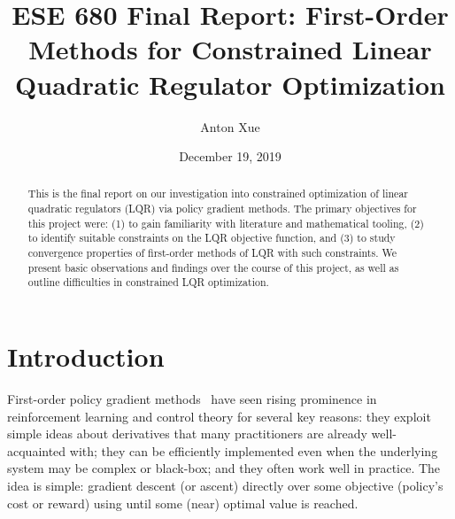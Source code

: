 \documentclass[11pt]{article}  %
\title{\LARGE \bf
ESE 680 Final Report:
First-Order Methods for
Constrained Linear Quadratic Regulator Optimization
}
\author{Anton Xue}%
\date{December 19, 2019}
\begin{document}

\maketitle
\thispagestyle{empty}
\pagestyle{empty}



\begin{abstract}
This is the final report on our investigation into
constrained optimization of linear quadratic regulators (LQR)
via policy gradient methods.
The primary objectives for this project were:
(1) to gain familiarity with literature and mathematical tooling,
(2) to identify suitable constraints on the LQR objective function,
and
(3) to study convergence properties of first-order methods of LQR
with such constraints.
We present basic observations and findings over the course of this project,
as well as outline difficulties in constrained LQR optimization.
\end{abstract}







\section{Introduction}
\label{sec:introduction}
First-order policy gradient methods~\cite{sutton2000policy}
have seen rising prominence in reinforcement learning and control theory
for several key reasons:
they exploit simple ideas about derivatives that many practitioners
are already well-acquainted with;
they can be efficiently implemented even when the underlying system
may be complex or black-box;
and they often work well in practice.
The idea is simple: gradient descent (or ascent) directly over some
objective (policy's cost or reward) using
until some (near) optimal value is reached.
\end{document}
